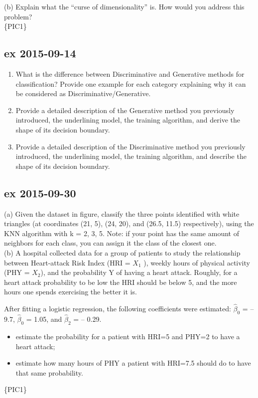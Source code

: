\documentclass[a4paper,12pt,titlepage]{article} %
\begin{document}
(b) Explain what the “curse of dimensionality” is. How would you address this problem?\\
\{PIC1\}

\subsection{ex 2015-09-14}
\begin{enumerate}
\item[(a)] What is the difference between Discriminative and Generative methods for classification? Provide one example for each category explaining why it can be considered as Discriminative/Generative.
\item[(b)] Provide a detailed description of the Generative method you previously introduced, the underlining model, the training algorithm, and derive the shape of its decision boundary.
\item[(c)] Provide a detailed description of the Discriminative method you previously introduced, the underlining model, the training algorithm, and describe the shape of its decision boundary.
\end{enumerate}

\subsection{ex 2015-09-30}
(a) Given the dataset in figure, classify the three points identified with white triangles (at coordinates (21, 5), (24, 20), and (26.5, 11.5) respectively), using the KNN algorithm with k = 2, 3, 5. Note: if your point has the same amount of neighbors for each class, you can assign it the class of the closest one.\\

(b) A hospital collected data for a group of patients to study the relationship between Heart-attack Risk Index (HRI = $X_{1}$ ), weekly hours of physical activity (PHY = $X_{2}$), and the probability Y of having a heart attack. Roughly, for a heart attack probability to be low the HRI should be below 5, and the more hours one spends exercising the better it is.

After fitting a logistic regression, the following coefficients were estimated: $ \hat{\beta}_{0} $ = --9.7, $ \hat{\beta}_{0} $ = 1.05, and $ \hat{\beta}_{2} $ = -- 0.29.
\begin{itemize}
\item  estimate the probability for a patient with HRI=5 and PHY=2 to have a heart attack;
\item estimate how many hours of PHY a patient with HRI=7.5 should do to have that same probability.
\end{itemize}
\{PIC1\}
\end{document}
